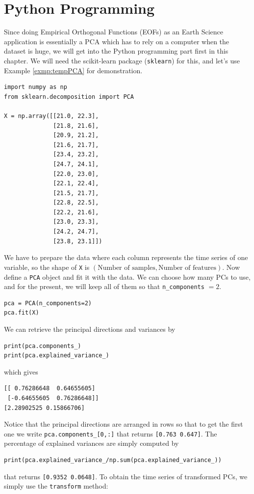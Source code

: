 \section{Python Programming}
Since doing Empirical Orthogonal Functions (EOFs) as an Earth Science application is essentially a PCA which has to rely on a computer when the dataset is huge, we will get into the Python programming part first in this chapter. We will need the scikit-learn package (\texttt{sklearn}) for this, and let's use Example \ref{exmp:tempPCA} for demonstration.
\begin{lstlisting}
import numpy as np
from sklearn.decomposition import PCA    

X = np.array([[21.0, 22.3],
              [21.8, 21.6],
              [20.9, 21.2],
              [21.6, 21.7],
              [23.4, 23.2],
              [24.7, 24.1],
              [22.0, 23.0],
              [22.1, 22.4],
              [21.5, 21.7],
              [22.8, 22.5],
              [22.2, 21.6],
              [23.0, 23.3],
              [24.2, 24.7],
              [23.8, 23.1]])
\end{lstlisting}
We have to prepare the data where each column represents the time series of one variable, so the shape of \verb|X| is $(\text{Number of samples}, \text{Number of features})$. Now define a \verb|PCA| object and fit it with the data. We can choose how many PCs to use, and for the present, we will keep all of them so that \verb|n_components| $=2$.
\begin{lstlisting}
pca = PCA(n_components=2)
pca.fit(X)    
\end{lstlisting}
We can retrieve the principal directions and variances by
\begin{lstlisting}
print(pca.components_)
print(pca.explained_variance_)    
\end{lstlisting}
which gives
\begin{lstlisting}
[[ 0.76286648  0.64655605]
 [-0.64655605  0.76286648]]
[2.28902525 0.15866706] 
\end{lstlisting}
Notice that the principal directions are arranged in rows so that to get the first one we write \verb|pca.components_[0,:]| that returns \verb|[0.763 0.647]|. The percentage of explained variances are simply computed by
\begin{lstlisting}
print(pca.explained_variance_/np.sum(pca.explained_variance_))
\end{lstlisting}
that returns \verb|[0.9352 0.0648]|. To obtain the time series of transformed PCs, we simply use the \verb|transform| method:
